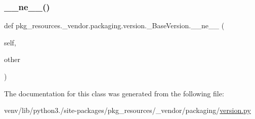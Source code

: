 \subsubsection{\texorpdfstring{\+\_\+\+\_\+ne\+\_\+\+\_\+()}{\_\_ne\_\_()}}
{\footnotesize\ttfamily def pkg\+\_\+resources.\+\_\+vendor.\+packaging.\+version.\+\_\+\+Base\+Version.\+\_\+\+\_\+ne\+\_\+\+\_\+ (\begin{DoxyParamCaption}\item[{}]{self,  }\item[{}]{other }\end{DoxyParamCaption})}



The documentation for this class was generated from the following file\+:\begin{DoxyCompactItemize}
\item 
venv/lib/python3./site-\/packages/pkg\+\_\+resources/\+\_\+vendor/packaging/\hyperlink{pkg__resources_2__vendor_2packaging_2version_8py}{version.\+py}\end{DoxyCompactItemize}
